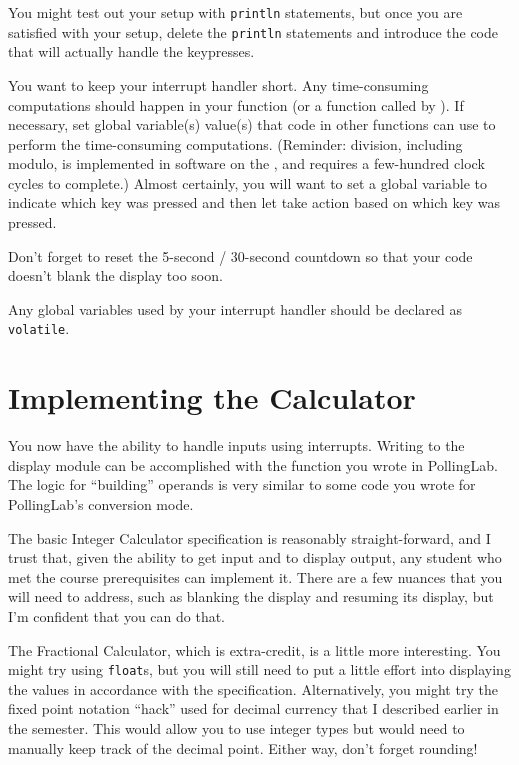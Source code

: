You might test out your setup with \lstinline{println} statements, but once you
are satisfied with your setup, delete the \lstinline{println} statements and
introduce the code that will actually handle the keypresses.

You want to keep your interrupt handler short. Any time-consuming computations
should happen in your  function (or a function called by
). If necessary, set global variable(s) value(s) that code in
other functions can use to perform the time-consuming computations. (Reminder:
division, including modulo, is implemented in software on the \nano, and
requires a few-hundred clock cycles to complete.) Almost certainly, you will
want to set a global variable to indicate which key was pressed and then let
 take action based on which key was pressed.

Don't forget to reset the 5-second / 30-second countdown so that your code
doesn't blank the display too soon.

Any global variables used by your interrupt handler should be declared as
\lstinline{volatile}.

\section{Implementing the Calculator}\label{sec:Calculator}

You now have the ability to handle inputs using interrupts. Writing to the
display module can be accomplished with the  function
you wrote in PollingLab. The logic for ``building'' operands is very similar to
some code you wrote for PollingLab's conversion mode.

The basic Integer Calculator specification is reasonably straight-forward, and
I trust that, given the ability to get input and to display output, any student
who met the course prerequisites can implement it. There are a few nuances that
you will need to address, such as blanking the display and resuming its
display, but I'm confident that you can do that.

The Fractional Calculator, which is extra-credit, is a little more interesting.
You might try using \lstinline{float}s, but you will still need to put a little
effort into displaying the values in accordance with the specification.
Alternatively, you might try the fixed point notation ``hack'' used for decimal
currency that I described earlier in the semester. This would allow you to use
integer types but would need to manually keep track of the decimal point.
Either way, don't forget rounding!


